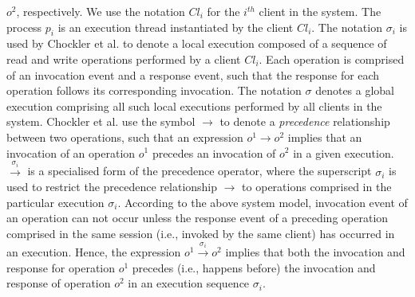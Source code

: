 \documentclass[journal,compsoc]{IEEEtran}
\begin{document}
 $\mathit{o}^2$, respectively. %
We use the notation $\mathit{Cl}_i$ for the $i^{th}$ client in the system. The process $ p_i$ is an execution thread instantiated by the client $\mathit{Cl}_i$. %
  The
  notation $\sigma_i$ is used by Chockler et al. to denote a local execution composed of a sequence of read and write operations  performed by  a client $\mathit{Cl}_i$. %
 Each operation is comprised of an invocation event and a response event, such that %
  the response for each operation follows its corresponding invocation. The notation $\sigma$ denotes a global execution comprising all such local executions performed by all clients in the system. Chockler et al. use the symbol $\rightarrow$ to denote a   \emph{precedence} relationship \cite{Bailis:2013:BCC:2463676.2465279} between two operations, such that an expression $\mathit{o}^1 \rightarrow \mathit{o}^2$ implies that an invocation of an operation $\mathit{o}^1$ precedes an invocation of $\mathit{o}^2$ in a given execution.  $\xrightarrow{\sigma_i}$ is a specialised form of the precedence operator, where the superscript $\sigma_i$ is used to restrict the precedence relationship $\rightarrow$ to operations comprised in the  particular execution  $\sigma_i$.  According to the above system model, %
  invocation event of an operation can not occur unless the response event of a preceding operation comprised in the same session (i.e., invoked by the same client) has occurred in an execution. Hence, the expression $\mathit{o}^1 \xrightarrow{\sigma_i} \mathit{o}^2$
  implies that both the invocation and response for operation $\mathit{o}^1$ precedes (i.e., happens before) the invocation and response of operation $\mathit{o}^2$ in an execution sequence $\sigma_i$.  %
\end{document}
